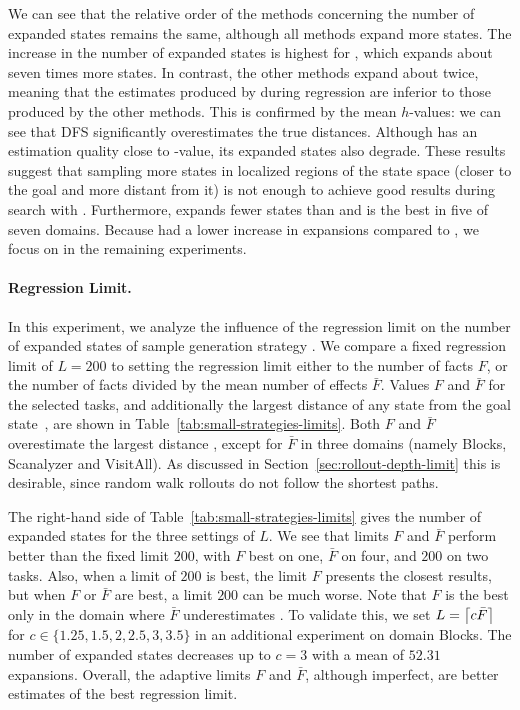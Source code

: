 We can see that the relative order of the methods concerning the number of expanded states remains the same, although all methods expand more states. The increase in the number of expanded states is highest for \hnndfs, which expands about seven times more states. In contrast, the other methods expand about twice, meaning that the estimates produced by \dfs during regression are inferior to those produced by the other methods. This is confirmed by the mean $h$-values: we can see that DFS significantly overestimates the true distances. Although \bfs has an estimation quality close to \hstar-value, its expanded states also degrade. These results suggest that sampling more states in localized regions of the state space (\bfs closer to the goal and \dfs more distant from it) is not enough to achieve good results during search with \gbfs.
Furthermore, \hnnbfsrw expands fewer states than \hnnrw and is the best in five of seven domains. Because \hnnbfsrw had a lower increase in expansions compared to \hnnrw, we focus on \bfsrw in the remaining experiments.



\paragraph{Regression Limit.}

In this experiment, we analyze the influence of the regression limit on the number of expanded states of sample generation strategy \bfsrw. We compare a fixed regression limit of $L=200$ to setting the regression limit either to the number of facts $F$, or the number of facts divided by the mean number of effects $\bar F$. Values $F$ and $\bar F$ for the selected tasks, and additionally the largest distance of any state from the goal state~\distfarthest, are shown in Table~\ref{tab:small-strategies-limits}. Both $F$ and $\bar F$ overestimate the largest distance \distfarthest, except for $\bar F$ in three domains (namely Blocks, Scanalyzer and VisitAll). As discussed in Section~\ref{sec:rollout-depth-limit} this is desirable, since random walk rollouts do not follow the shortest paths.



The right-hand side of Table~\ref{tab:small-strategies-limits} gives the number of expanded states for the three settings of $L$. We see that limits $F$ and $\bar F$ perform better than the fixed limit $200$, with $F$ best on one, $\bar F$ on four, and $200$ on two tasks. Also, when a limit of $200$ is best, the limit $F$ presents the closest results, but when $F$ or $\bar F$ are best, a limit $200$ can be much worse.  Note that $F$ is the best only in the domain where $\bar F$ underestimates \distfarthest.  To validate this, we set $L=\left\lceil c\bar F\right\rceil$ for $c\in\{1.25,1.5,2,2.5,3,3.5\}$ in an additional experiment on domain Blocks. The number of expanded states decreases up to $c=3$ with a mean of $52.31$ expansions. Overall, the adaptive limits $F$ and $\bar F$, although imperfect, are better estimates of the best regression limit.

